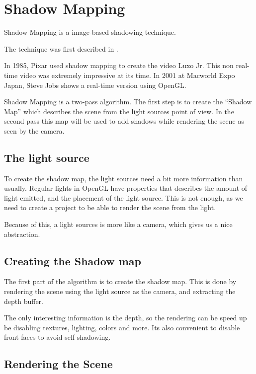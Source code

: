 
\section{Shadow Mapping}

Shadow Mapping is a image-based shadowing technique.

The technique was first described in \cite{lance78}.

In 1985, Pixar used shadow mapping to create the video Luxo Jr. This
non real-time video was extremely impressive at its time.
In 2001 at Macworld Expo Japan, Steve Jobs shows a real-time version
using OpenGL.


Shadow Mapping is a two-pass algorithm. The first step is to create
the ``Shadow Map'' which describes the scene from the light sources
point of view. In the second pass this map will be used to add shadows
while rendering the scene as seen by the camera.


\subsection{The light source}

To create the shadow map, the light sources need a bit more
information than usually. Regular lights in OpenGL have properties
that describes the amount of light emitted, and the placement of the
light source. This is not enough, as we need to create a project to be
able to render the scene from the light. 

Because of this, a light sources is more like a camera, which gives us
a nice abstraction. 


\subsection{Creating the Shadow map}

The first part of the algorithm is to create the shadow map. This is
done by rendering the scene using the light source as the camera, and
extracting the depth buffer.

 The only interesting information is
the depth, so the rendering can be speed up be disabling textures,
lighting, colors and more. Its also convenient to disable front faces
to avoid self-shadowing. %


\subsection{Rendering the Scene}

